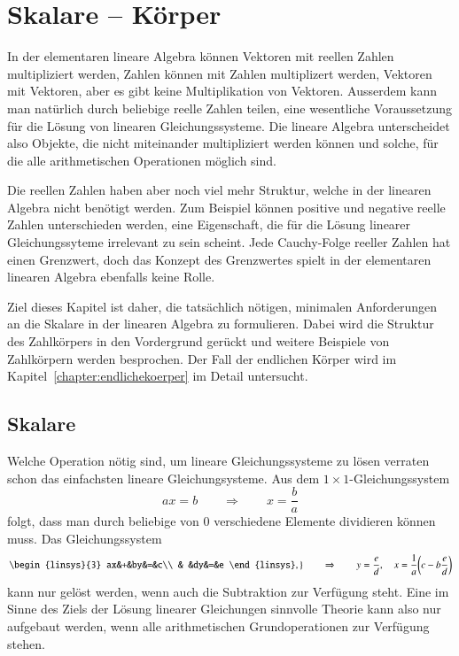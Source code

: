 %
%
%
\section{Skalare -- Körper}
In der elementaren lineare Algebra können Vektoren mit reellen
Zahlen multipliziert werden, Zahlen können mit Zahlen multiplizert
werden, Vektoren mit Vektoren, aber es gibt keine Multiplikation
von Vektoren.
Ausserdem kann man natürlich durch beliebige reelle Zahlen teilen,
eine wesentliche Voraussetzung für die Lösung von linearen Gleichungssysteme.
Die lineare Algebra unterscheidet also Objekte, die nicht miteinander
multipliziert werden können und solche, für die alle arithmetischen
Operationen möglich sind.

Die reellen Zahlen haben aber noch viel mehr Struktur, welche in
der linearen Algebra nicht benötigt werden.
Zum Beispiel können positive und negative reelle Zahlen unterschieden
werden, eine Eigenschaft, die für die Lösung linearer Gleichungssyteme
irrelevant zu sein scheint.
Jede Cauchy-Folge reeller Zahlen hat einen Grenzwert, doch das Konzept
des Grenzwertes spielt in der elementaren linearen Algebra ebenfalls
keine Rolle.

Ziel dieses Kapitel ist daher, die tatsächlich nötigen, minimalen
Anforderungen an die Skalare in der linearen Algebra zu formulieren.
Dabei wird die Struktur des Zahlkörpers in den Vordergrund gerückt
und weitere Beispiele von Zahlkörpern werden besprochen.
Der Fall der endlichen Körper wird im Kapitel~\ref{chapter:endlichekoerper}
im Detail untersucht.

\subsection{Skalare}
Welche Operation nötig sind, um lineare Gleichungssysteme zu lösen
verraten schon das einfachsten lineare Gleichungsysteme.
Aus dem $1\times 1$-Gleichungssystem 
\[
ax=b\qquad\Rightarrow\qquad x=\frac{b}{a}
\]
folgt, dass man durch beliebige von $0$ verschiedene Elemente dividieren
können muss.
Das Gleichungssystem
\[
\left.
\begin{linsys}{3}
ax&+&by&=&c\\
  & &dy&=&e
\end{linsys},
\right\}
\qquad\Rightarrow\qquad
y=\frac{e}{d},\quad
x=\frac1{a}\biggl(c-b\frac{e}{d}\biggr)
\]
kann nur gelöst werden, wenn auch die Subtraktion zur Verfügung steht.
Eine im Sinne des Ziels der Lösung linearer Gleichungen sinnvolle 
Theorie kann also nur aufgebaut werden, wenn alle arithmetischen
Grundoperationen zur Verfügung stehen.

